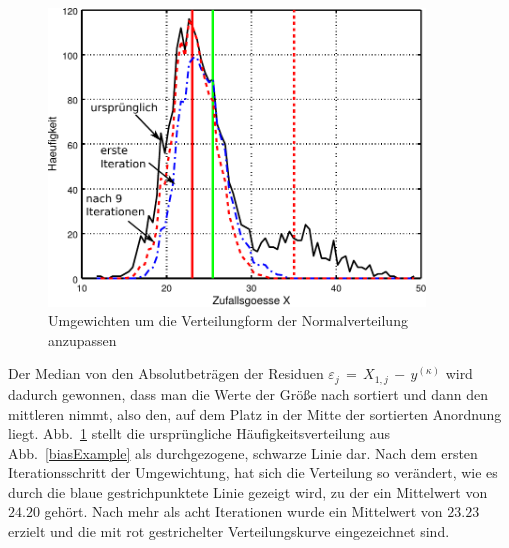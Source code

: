 \begin{figure}
\begin{center}
\includegraphics[width=100mm]{03_vorlesung/media/learn_robust_2.pdf}
\caption{\label{RobustIter} Umgewichten um die Verteilungform der Normalverteilung anzupassen}
\end{center}
\end{figure}

Der Median von den Absolutbeträgen der Residuen $\varepsilon_j \, = \, X_{1,j} \, - \, y^{(\kappa)}$ wird dadurch gewonnen,
dass man die Werte der Größe nach sortiert und dann den mittleren nimmt, also den, auf dem Platz in der Mitte der sortierten
Anordnung liegt.
Abb.~\ref{RobustIter} stellt die ursprüngliche Häufigkeitsverteilung aus Abb.~\ref{biasExample} als
durchgezogene, schwarze Linie dar. Nach dem ersten Iterationsschritt der Umgewichtung, hat sich die Verteilung so verändert,
wie es durch die blaue gestrichpunktete Linie gezeigt wird, zu der ein Mittelwert von $24.20$ gehört. Nach mehr als acht Iterationen
wurde ein Mittelwert von $23.23$ erzielt und die mit rot gestrichelter Verteilungskurve eingezeichnet sind.

